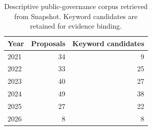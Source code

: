 \begin{table}[t]\centering\small
\caption{Descriptive public-governance corpus retrieved from Snapshot. Keyword candidates are retained for evidence binding.}
\label{tab:public-corpus}
\begin{tabular}{@{}lrr@{}}\toprule
Year & Proposals & Keyword candidates \\ \midrule
2021 & 34 & 9 \\
2022 & 33 & 25 \\
2023 & 40 & 27 \\
2024 & 49 & 38 \\
2025 & 27 & 22 \\
2026 & 8 & 8 \\
\bottomrule
\end{tabular}
\end{table}
